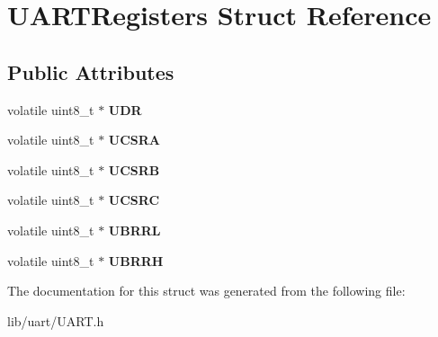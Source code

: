 \hypertarget{struct_u_a_r_t_registers}{\section{U\-A\-R\-T\-Registers Struct Reference}
\label{struct_u_a_r_t_registers}
}
\subsection*{Public Attributes}
\begin{DoxyCompactItemize}
\item 
\hypertarget{struct_u_a_r_t_registers_a319ffcce39d3a759f8b8f99caeffd6ff}{volatile uint8\-\_\-t $\ast$ {\bfseries U\-D\-R}}\label{struct_u_a_r_t_registers_a319ffcce39d3a759f8b8f99caeffd6ff}

\item 
\hypertarget{struct_u_a_r_t_registers_a5617be018643b8bbf302e9e7f0574662}{volatile uint8\-\_\-t $\ast$ {\bfseries U\-C\-S\-R\-A}}\label{struct_u_a_r_t_registers_a5617be018643b8bbf302e9e7f0574662}

\item 
\hypertarget{struct_u_a_r_t_registers_aa9d53e58476eb92a89921a9cc4542a80}{volatile uint8\-\_\-t $\ast$ {\bfseries U\-C\-S\-R\-B}}\label{struct_u_a_r_t_registers_aa9d53e58476eb92a89921a9cc4542a80}

\item 
\hypertarget{struct_u_a_r_t_registers_ad066bd333b8f00ad809db7fbefa9364f}{volatile uint8\-\_\-t $\ast$ {\bfseries U\-C\-S\-R\-C}}\label{struct_u_a_r_t_registers_ad066bd333b8f00ad809db7fbefa9364f}

\item 
\hypertarget{struct_u_a_r_t_registers_a71e0561ae6d0d0f7aeb21c112aeb1c26}{volatile uint8\-\_\-t $\ast$ {\bfseries U\-B\-R\-R\-L}}\label{struct_u_a_r_t_registers_a71e0561ae6d0d0f7aeb21c112aeb1c26}

\item 
\hypertarget{struct_u_a_r_t_registers_ae39abc442e09526eed2493efdb80279a}{volatile uint8\-\_\-t $\ast$ {\bfseries U\-B\-R\-R\-H}}\label{struct_u_a_r_t_registers_ae39abc442e09526eed2493efdb80279a}

\end{DoxyCompactItemize}


The documentation for this struct was generated from the following file\-:\begin{DoxyCompactItemize}
\item 
lib/uart/U\-A\-R\-T.\-h\end{DoxyCompactItemize}
